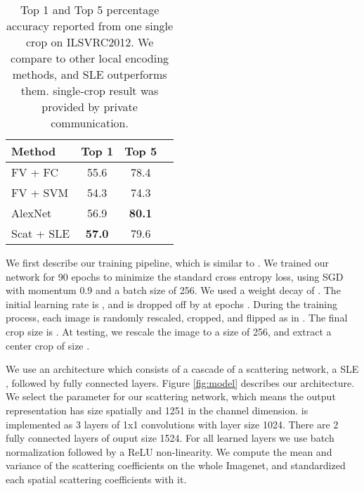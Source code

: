 \documentclass[10pt,twocolumn,letterpaper]{article}
\newcommand{\citep}{\cite}
\begin{document}
\begin{table}
\begin{center}
\begin{tabular}{|l|c|c|c|}
\hline
\bf Method  &\bf Top 1 &\bf Top 5  \\
\hline







FV + FC    \cite{perronnin2015fisher} &55.6  & 78.4 \\FV + SVM   \cite{sanchez2011high}          & 54.3 & 74.3\\AlexNet  & 56.9 &\bf 80.1\\Scat + SLE  & \bf 57.0&79.6\\\hline
\end{tabular}
\end{center}
\label{res_1x1}
\caption{Top 1 and Top 5 percentage accuracy reported from one single crop on ILSVRC2012. We compare to other local encoding methods, and SLE outperforms them.  \cite{perronnin2015fisher} single-crop result was provided by private communication.}
\end{table}

We first describe our training pipeline, which is similar to \cite{zagoruyko2016wide}. We trained our network for 90 epochs to minimize the standard cross entropy loss, using SGD with momentum 0.9 and a batch size of 256. We used a weight decay of . The initial learning rate is , and is dropped off by  at epochs . During the training process, each image is randomly rescaled, cropped, and flipped as in \citep{he2015deep}. The final crop size is . At testing, we rescale the image to a size of 256, and extract a center crop of size . 

We use an architecture which consists of a cascade of a scattering network, a SLE , followed by fully connected layers. Figure \ref{fig:model} describes our architecture. We select the parameter  for our scattering network, which means the output representation has size  spatially and 1251 in the channel dimension.  is implemented as 3 layers of 1x1 convolutions  with layer size 1024. There are 2 fully connected layers of ouput size 1524. For all learned layers we use batch normalization \cite{ioffe2015batch} followed by a ReLU \cite{krizhevsky2012imagenet} non-linearity. We compute the mean and variance of the scattering coefficients on the whole Imagenet, and standardized each spatial scattering coefficients with it.
\end{document}
